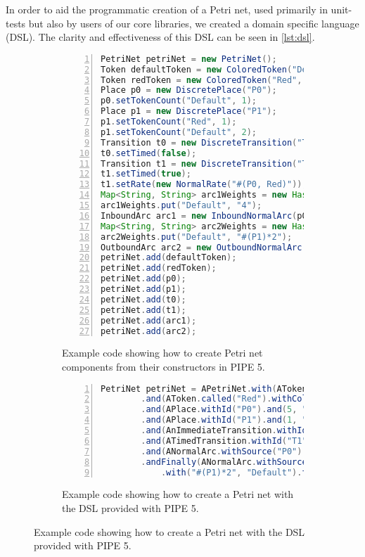 In order to aid the programmatic creation of a Petri net, used primarily in unit-tests but also by users of our core libraries, we created a domain specific language (DSL). 
The clarity and effectiveness of this DSL can be seen in \cref{lst:dsl}.

\begin{figure}[tb]
\centering
\begin{subfigure}[b]{\linewidth}
\vspace{0.5cm}
\begin{lstlisting}[numbers=left, language=Java, frame=single]
PetriNet petriNet = new PetriNet();
Token defaultToken = new ColoredToken("Default", Color.BLACK);
Token redToken = new ColoredToken("Red", Color.RED);
Place p0 = new DiscretePlace("P0");
p0.setTokenCount("Default", 1);
Place p1 = new DiscretePlace("P1");
p1.setTokenCount("Red", 1);
p1.setTokenCount("Default", 2);
Transition t0 = new DiscreteTransition("T0");
t0.setTimed(false);
Transition t1 = new DiscreteTransition("T1");
t1.setTimed(true);
t1.setRate(new NormalRate("#(P0, Red)"));
Map<String, String> arc1Weights = new HashMap<>();
arc1Weights.put("Default", "4");
InboundArc arc1 = new InboundNormalArc(p0, t0, arc1Weights);
Map<String, String> arc2Weights = new HashMap<>();
arc2Weights.put("Default", "#(P1)*2");
OutboundArc arc2 = new OutboundNormalArc(t0, p0, arc2Weights);
petriNet.add(defaultToken);
petriNet.add(redToken);
petriNet.add(p0);
petriNet.add(p1);
petriNet.add(t0);
petriNet.add(t1);
petriNet.add(arc1);
petriNet.add(arc2);
\end{lstlisting}
\caption{Example code showing how to create Petri net components from their constructors in PIPE 5.}
\end{subfigure}

\begin{subfigure}[b]{\linewidth}
\vspace{0.5cm}
\begin{lstlisting}[numbers=left,language=Java,frame=single]
PetriNet petriNet = APetriNet.with(AToken.called("Default").withColor(Color.BLACK))
        .and(AToken.called("Red").withColor(Color.RED))
        .and(APlace.withId("P0").and(5, "Default").tokens())
        .and(APlace.withId("P1").and(1, "Red").and(2, "Default").to())
        .and(AnImmediateTransition.withId("T0"))
        .and(ATimedTransition.withId("T1").andRate("#(P0, Red)"))
        .and(ANormalArc.withSource("P0").andTarget("T0").and("4", "Default").tokens())
        .andFinally(ANormalArc.withSource("T0").andTarget("P0")
            .with("#(P1)*2", "Default").tokens());
\end{lstlisting}
\caption{Example code showing how to create a Petri net with the DSL provided with PIPE 5.}
\end{subfigure}


\end{figure}
